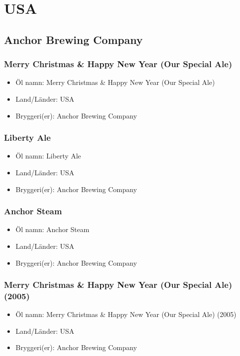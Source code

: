 \documentclass[11pt]{article}
\begin{document}
\section{USA}
\label{sec:org9c2a991}
\subsection{Anchor Brewing Company}
\label{sec:org4b17c24}
\subsubsection{Merry Christmas \& Happy New Year (Our Special Ale)}
\label{sec:org1ec9743}
\begin{itemize}
\item Öl namn: Merry Christmas \& Happy New Year (Our Special Ale)
\item Land/Länder: USA
\item Bryggeri(er): Anchor Brewing Company
\end{itemize}
\subsubsection{Liberty Ale}
\label{sec:orgefe31dd}
\begin{itemize}
\item Öl namn: Liberty Ale
\item Land/Länder: USA
\item Bryggeri(er): Anchor Brewing Company
\end{itemize}
\subsubsection{Anchor Steam}
\label{sec:org0920905}
\begin{itemize}
\item Öl namn: Anchor Steam
\item Land/Länder: USA
\item Bryggeri(er): Anchor Brewing Company
\end{itemize}
\subsubsection{Merry Christmas \& Happy New Year (Our Special Ale) (2005)}
\label{sec:orge694f19}
\begin{itemize}
\item Öl namn: Merry Christmas \& Happy New Year (Our Special Ale) (2005)
\item Land/Länder: USA
\item Bryggeri(er): Anchor Brewing Company
\end{itemize}
\end{document}
